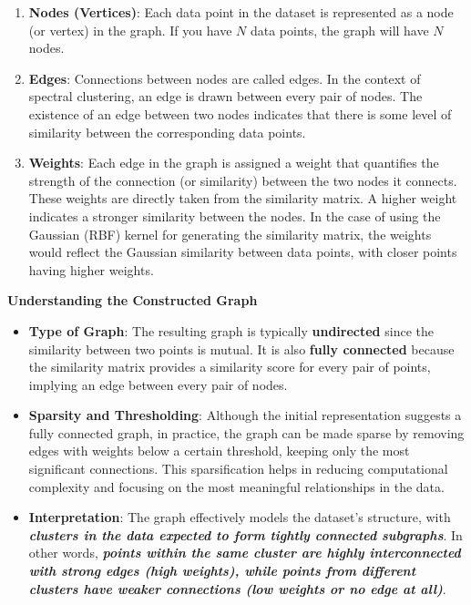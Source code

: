 \documentclass[11pt]{article}
\begin{document}
\begin{enumerate}
\def\labelenumi{\arabic{enumi}.}
\item
  \textbf{Nodes (Vertices)}: Each data point in the dataset is
  represented as a node (or vertex) in the graph. If you have \(N\) data
  points, the graph will have \(N\) nodes.
\item
  \textbf{Edges}: Connections between nodes are called edges. In the
  context of spectral clustering, an edge is drawn between every pair of
  nodes. The existence of an edge between two nodes indicates that there
  is some level of similarity between the corresponding data points.
\item
  \textbf{Weights}: Each edge in the graph is assigned a weight that
  quantifies the strength of the connection (or similarity) between the
  two nodes it connects. These weights are directly taken from the
  similarity matrix. A higher weight indicates a stronger similarity
  between the nodes. In the case of using the Gaussian (RBF) kernel for
  generating the similarity matrix, the weights would reflect the
  Gaussian similarity between data points, with closer points having
  higher weights.
\end{enumerate}

    

    \textbf{Understanding the Constructed Graph}

\begin{itemize}
\item
  \textbf{Type of Graph}: The resulting graph is typically
  \textbf{undirected} since the similarity between two points is mutual.
  It is also \textbf{fully connected} because the similarity matrix
  provides a similarity score for every pair of points, implying an edge
  between every pair of nodes.
\item
  \textbf{Sparsity and Thresholding}: Although the initial
  representation suggests a fully connected graph, in practice, the
  graph can be made sparse by removing edges with weights below a
  certain threshold, keeping only the most significant connections. This
  sparsification helps in reducing computational complexity and focusing
  on the most meaningful relationships in the data.
\item
  \textbf{Interpretation}: The graph effectively models the dataset's
  structure, with \textbf{\emph{clusters in the data expected to form
  tightly connected subgraphs}}. In other words, \textbf{\emph{points
  within the same cluster are highly interconnected with strong edges
  (high weights), while points from different clusters have weaker
  connections (low weights or no edge at all)}}.
\end{itemize}
\end{document}
